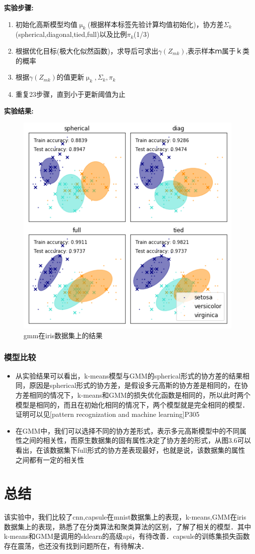 \documentclass{article}
\begin{document}
\textbf{实验步骤:}
\begin{enumerate}
\item 初始化高斯模型均值$\upmu_k$(根据样本标签先验计算均值初始化)，协方差$\Sigma_k$(spherical,diagonal,tied,full)以及比例$\pi_k$(1/3)
\item 根据优化目标(极大化似然函数)，求导后可求出$\gamma(Z_{mk})$,表示样本ｍ属于ｋ类的概率
\item 根据$\gamma(Z_{mk})$的值更新$\upmu_k,\Sigma_k,\pi_k$
\item 重复23步骤，直到小于更新阈值为止
\end{enumerate}
\textbf{实验结果:}
\begin{figure}[h]
	\centering\includegraphics[scale=1.0]{gmm_iris}
	\caption{gmm在iris数据集上的结果}
\end{figure}
\subsubsection{模型比较}
\begin{itemize}
\item 从实验结果可以看出，k-means模型与GMM的spherical形式的协方差的结果相同，原因是spherical形式的协方差，是假设多元高斯的协方差是相同的，在协方差相同的情况下，k-means和GMM的损失优化函数是相同的，所以此时两个模型是相同的，而且在初始化相同的情况下，两个模型就是完全相同的模型．证明可以见[pattern recognization and machine learning\cite{bishop2006pattern}]P305
\item 在GMM中，我们可以选择不同的协方差形式，表示多元高斯模型中的不同属性之间的相关性，而原生数据集的固有属性决定了协方差的形式，从图3.6可以看出，在该数据集下full形式的协方差表现最好，也就是说，该数据集的属性之间都有一定的相关性
\end{itemize}

\section{总结}
该实验中，我们比较了cnn,capsule在mnist数据集上的表现，k-means,GMM在iris数据集上的表现，熟悉了在分类算法和聚类算法的区别，了解了相关的模型．其中k-means和GMM是调用的sklearn的高级api，有待改善．capsule的训练集损失函数存在震荡，也还没有找到问题所在，有待解决．

\end{document}
